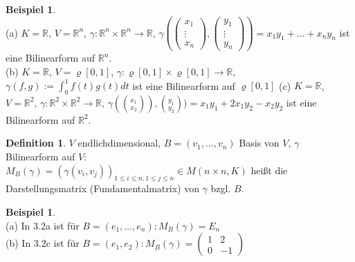 \documentclass[10pt,a4paper,numbers=endperiod]{scrartcl}
\theoremstyle{definition}
\newtheorem{defi}[satz]{Definition}
\newtheorem{bsp}[satz]{Beispiel}
\def\RR{{\mathbb R}}
\begin{document}
\begin{bsp}
	$ $\\
	(a) $K = \RR$, $V = \RR^n$, $\gamma: \RR^n \times \RR^n \rightarrow \RR$, $\gamma (\begin{pmatrix}
	x_1\\
	\vdots\\
	x_n
	\end{pmatrix}, \begin{pmatrix}
	y_1\\
	\vdots\\
	y_n
	\end{pmatrix}) = x_1 y_1 + \ldots + x_n y_n$ ist eine Bilinearform auf $\RR^n$.\\
	(b) $K = \RR$, $V = \varrho [0,1]$, $\gamma: \varrho[0,1] \times \varrho[0,1] \rightarrow \RR$, $\gamma(f,g) := \int_{0}^{1} f(t) g(t) dt$ ist eine Bilinearform auf $\varrho[0,1]$
	(c) $K = \RR$, $V = \RR^2$, $\gamma : \RR^2 \times \RR^2 \rightarrow \RR$, $\gamma(\binom{x_1}{x_2}), \binom{y_1}{y_2}) = x_1y_1 + 2x_1y_2 - x_2y_2$ ist eine Bilinearform auf $\RR^2$. 
\end{bsp}

\begin{defi}
	$V$ endlichdimensional, $B = (v_1, \ldots, v_n)$ Basis von $V$, $\gamma$ Bilinearform auf $V$:\\
	$M_B (\gamma) = (\gamma(v_i, v_j))_{1 \leq i \leq n, 1 \leq j \leq n} \in M(n \times n, K)$ heißt die Darstellungsmatrix (Fundamentalmatrix) von $\gamma$ bzgl. $B$. 
\end{defi}

\begin{bsp}
	$ $\\
	(a) In 3.2a ist für $B=(e_1, \ldots, e_n): M_B (\gamma) = E_n$\\
	(b) In 3.2c ist für $B=(e_1, e_2): M_B(\gamma) = \begin{pmatrix}
	1 & 2\\
	0 & -1
	\end{pmatrix}$
\end{bsp}
\end{document}

